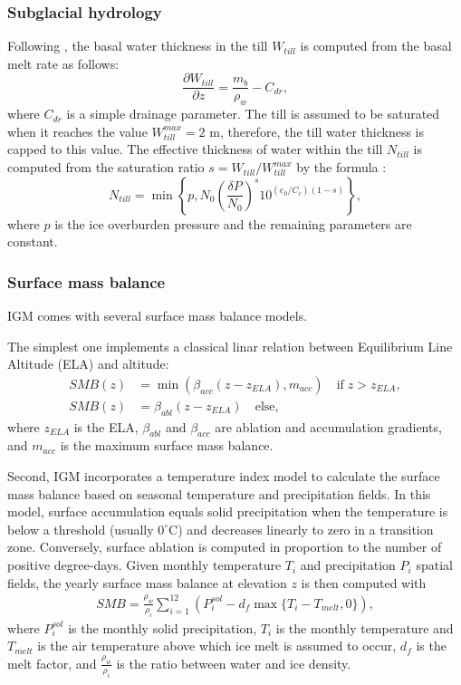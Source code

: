 \documentclass[10pt,twocolumn]{article}
\begin{document}
\subsubsection{Subglacial hydrology}
\label{phys_subglacial_hydrology}

Following \citet{Bueler2015}, the basal water thickness in the till $W_{till}$ 
is computed from the basal melt rate as follows:
\begin{equation}
\frac{\partial W_{till} }{ \partial z} = \frac{m_b}{\rho_w} - C_{dr},
\label{W_till}
\end{equation}
where $C_{dr}$ is a simple drainage parameter. The till is assumed to be saturated 
when it reaches the value $W_{till}^{max} = 2$ m, therefore, the till water thickness 
is capped to this value. The effective thickness of water within the till $N_{till}$ 
is computed from the saturation ratio $s= W_{till} / W_{till}^{max}$ by the formula
\citep{Bueler2015}:
\begin{equation}
N_{till} = \min \left\{ p, N_0 \left( \frac{\delta P}{N_0} \right)^s 10^{(e_0/C_c)(1-s)} \right\},
\end{equation}
where $p$ is the ice overburden pressure and the remaining parameters are constant. 
 
\subsubsection{Surface mass balance}
\label{phys_smb}

IGM comes with several surface mass balance models.

The simplest one implements a classical
linar relation between Equilibrium Line Altitude (ELA) and altitude:
\begin{align}
SMB(z) & = \min(\beta_{acc} (z-z_{ELA}),m_{acc})\quad\textrm{if}\;z>z_{ELA}, \label{smb1} \\
SMB(z) & = \beta_{abl} (z-z_{ELA})\quad\textrm{else}, \label{smb2} 
\end{align}
where $z_{ELA}$ is the ELA, $\beta_{abl}$ and $\beta_{acc}$
are ablation and accumulation gradients, and $m_{acc}$ is the maximum surface mass balance.
 
Second, IGM incorporates a temperature index model \citep{hock2003} to calculate the 
surface mass balance based on seasonal temperature and precipitation fields.
In this model, surface accumulation equals solid precipitation when the temperature is 
below a threshold (usually $0^{\circ}$C) and decreases linearly to zero in a transition zone.
Conversely, surface ablation is computed in proportion to the number of positive degree-days.
Given monthly temperature $T_i$ and precipitation $P_i$ spatial fields, 
the yearly surface mass balance at elevation $z$ is then computed with 
\begin{align}
SMB = \frac{\rho_w}{\rho_i} \sum_{i=1}^{12} \left( P_i^{sol} - d_f \max \{ T_i - T_{melt}, 0 \} \right),
\label{smb3} 
\end{align}
where $P_i^{sol}$ is the monthly solid precipitation, $T_i$ is the monthly temperature 
and $T_{melt}$ is the air temperature above which ice melt is assumed to occur, 
$d_f$ is the melt factor,
and $\frac{\rho_w}{\rho_i}$ is the ratio between water and ice density.
\end{document}
